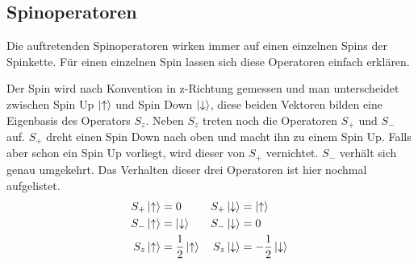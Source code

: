 \documentclass[11pt,a4paper]{scrartcl}
\begin{document}
\subsection{Spinoperatoren}
Die auftretenden Spinoperatoren wirken immer auf einen einzelnen Spins der Spinkette. Für einen einzelnen Spin lassen sich diese Operatoren einfach erklären.

Der Spin wird nach Konvention in z-Richtung gemessen und man unterscheidet zwischen Spin Up $\ket{\uparrow}$ und Spin Down $\ket{\downarrow}$, diese beiden Vektoren bilden eine Eigenbasis des Operators $S_z$. Neben $S_z$ treten noch die Operatoren $S_+$ und $S_-$ auf. $S_+$ dreht einen Spin Down nach oben und macht ihn zu einem Spin Up. Falls aber schon ein Spin Up vorliegt, wird dieser von $S_+$ vernichtet. $S_-$ verhält sich genau umgekehrt. Das Verhalten dieser drei Operatoren ist hier nochmal aufgelistet.
\begin{align*}
	S_+\ket{\uparrow}&=0 & S_+\ket{\downarrow}&=\ket{\uparrow}\\
	S_-\ket{\uparrow}&=\ket{\downarrow} & S_-\ket{\downarrow}&=0\\
	S_z\ket{\uparrow}&=\frac{1}{2}\ket{\uparrow} &
	S_z\ket{\downarrow}&=-\frac{1}{2}\ket{\downarrow}
\end{align*}
\end{document}
